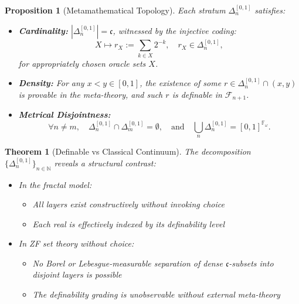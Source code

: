 \documentclass[12pt]{article}
\theoremstyle{definition}
\theoremstyle{plain}
\newtheorem{theorem}[definition]{Theorem}
\newtheorem{proposition}[definition]{Proposition}
\theoremstyle{remark}
\begin{document}
\begin{proposition}[Metamathematical Topology]
Each stratum \( \Delta_n^{[0,1]} \) satisfies:
\begin{itemize}
    \item \textbf{Cardinality:} \( |\Delta_n^{[0,1]}| = \mathfrak{c} \), witnessed by the injective coding:
    \[
    X \mapsto r_X := \sum_{k \in X} 2^{-k}, \quad r_X \in \Delta_n^{[0,1]},
    \]
    for appropriately chosen oracle sets \( X \).

    \item \textbf{Density:} For any \( x < y \in [0,1] \), the existence of some \( r \in \Delta_n^{[0,1]} \cap (x, y) \) is provable in the meta-theory, and such \( r \) is definable in \( \mathcal{F}_{n+1} \).

    \item \textbf{Metrical Disjointness:}
    \[
    \forall n \neq m,\quad \Delta_n^{[0,1]} \cap \Delta_m^{[0,1]} = \emptyset, \quad \text{and} \quad \bigcup_{n} \Delta_n^{[0,1]} = [0,1]^{\mathbb{F}_\omega}.
    \]
\end{itemize}
\end{proposition}

\begin{theorem}[Definable vs Classical Continuum]
The decomposition \( \{ \Delta_n^{[0,1]} \}_{n \in \mathbb{N}} \) reveals a structural contrast:
\begin{itemize}
    \item In the \emph{fractal model}:
    \begin{itemize}
        \item All layers exist constructively without invoking choice
        \item Each real is effectively indexed by its definability level
    \end{itemize}
    
    \item In \emph{ZF set theory without choice}:
    \begin{itemize}
        \item No Borel or Lebesgue-measurable separation of dense \( \mathfrak{c} \)-subsets into disjoint layers is possible
        \item The definability grading is unobservable without external meta-theory
    \end{itemize}
\end{itemize}
\end{theorem}
\end{document}
